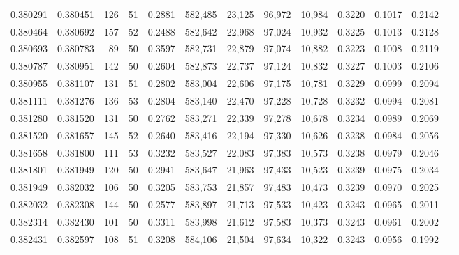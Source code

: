 \begin{tabular}{rrrrrrrrrrrrr}
0.380291 & 0.380451 &   126 &  51 &                                     0.2881 & 582,485 &  23,125 &  96,972 &  10,984 & 0.3220 & 0.1017 & 0.2142 \\
0.380464 & 0.380692 &   157 &  52 &                                     0.2488 & 582,642 &  22,968 &  97,024 &  10,932 & 0.3225 & 0.1013 & 0.2128 \\
0.380693 & 0.380783 &    89 &  50 &                                     0.3597 & 582,731 &  22,879 &  97,074 &  10,882 & 0.3223 & 0.1008 & 0.2119 \\
0.380787 & 0.380951 &   142 &  50 &                                     0.2604 & 582,873 &  22,737 &  97,124 &  10,832 & 0.3227 & 0.1003 & 0.2106 \\
0.380955 & 0.381107 &   131 &  51 &                                     0.2802 & 583,004 &  22,606 &  97,175 &  10,781 & 0.3229 & 0.0999 & 0.2094 \\
0.381111 & 0.381276 &   136 &  53 &                                     0.2804 & 583,140 &  22,470 &  97,228 &  10,728 & 0.3232 & 0.0994 & 0.2081 \\
0.381280 & 0.381520 &   131 &  50 &                                     0.2762 & 583,271 &  22,339 &  97,278 &  10,678 & 0.3234 & 0.0989 & 0.2069 \\
0.381520 & 0.381657 &   145 &  52 &                                     0.2640 & 583,416 &  22,194 &  97,330 &  10,626 & 0.3238 & 0.0984 & 0.2056 \\
0.381658 & 0.381800 &   111 &  53 &                                     0.3232 & 583,527 &  22,083 &  97,383 &  10,573 & 0.3238 & 0.0979 & 0.2046 \\
0.381801 & 0.381949 &   120 &  50 &                                     0.2941 & 583,647 &  21,963 &  97,433 &  10,523 & 0.3239 & 0.0975 & 0.2034 \\
0.381949 & 0.382032 &   106 &  50 &                                     0.3205 & 583,753 &  21,857 &  97,483 &  10,473 & 0.3239 & 0.0970 & 0.2025 \\
0.382032 & 0.382308 &   144 &  50 &                                     0.2577 & 583,897 &  21,713 &  97,533 &  10,423 & 0.3243 & 0.0965 & 0.2011 \\
0.382314 & 0.382430 &   101 &  50 &                                     0.3311 & 583,998 &  21,612 &  97,583 &  10,373 & 0.3243 & 0.0961 & 0.2002 \\
0.382431 & 0.382597 &   108 &  51 &                                     0.3208 & 584,106 &  21,504 &  97,634 &  10,322 & 0.3243 & 0.0956 & 0.1992 \\

\end{tabular}
